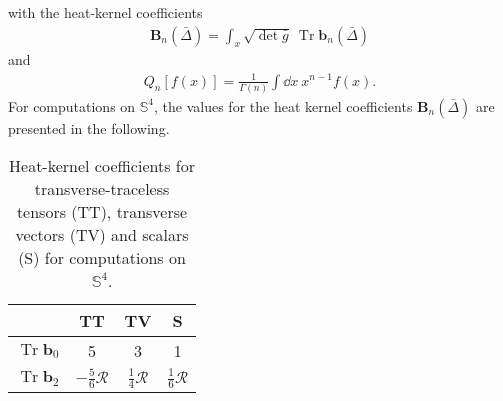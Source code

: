 with the heat-kernel coefficients 
\begin{align}
	\mathbf{B}_{n}(\bar{\Delta})=\int_x  \sqrt{\operatorname{det}\bar{g}} \  \operatorname{Tr} \mathbf{b}_{n}(\bar{\Delta})
\end{align}
and 
\begin{align}
	Q_{n}[f(x)]=\frac{1}{\Gamma(n)} \int \dd x \ x^{n-1} f(x).\label{eqn:Qfunc}
\end{align}
For computations on $\mathbb{S}^4$, the values for the heat kernel coefficients $\mathbf{B}_n(\bar{\Delta})$ are presented in the following.
\begin{table}[H]
	\centering
	\setlength{\tabcolsep}{5mm}
	\setlength\extrarowheight{2mm}
	\begin{tabular}{c | c c c}
	   & TT & TV & S\\ \hline
	   $\operatorname{Tr} \mathbf{b}_{0}$ & 5 &  3 & 1\\
	  $\operatorname{Tr} \mathbf{b}_{2}$ & $-\frac{5}{6}\mathcal{R}$ & $\frac{1}{4}\mathcal{R}$& $\frac{1}{6}\mathcal{R}$\\
	\end{tabular}
	\caption{Heat-kernel coefficients for transverse-traceless tensors (TT), transverse vectors (TV) and scalars (S) for computations on $\mathbb{S}^4$.}
\end{table}

